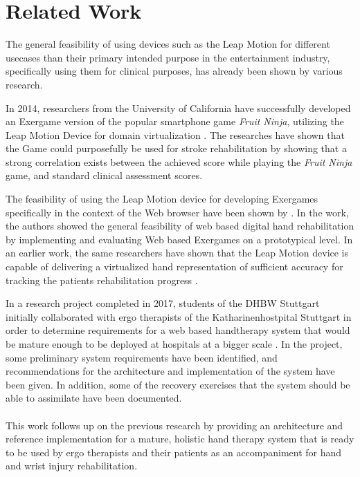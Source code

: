 \chapter{Related Work}
\label{sec:relatedwork}

The general feasibility of using devices such as the Leap Motion for different usecases than their primary intended purpose in the entertainment industry, specifically using them for clinical purposes, has already been shown by various research.

In 2014, researchers from the University of California have successfully developed an Exergame version of the popular smartphone game \emph{Fruit Ninja}, utilizing the Leap Motion Device for domain virtualization \cite{khademi2014free}. The researches have shown that the Game could purposefully be used for stroke rehabilitation by showing that a strong correlation exists between the achieved score while playing the \emph{Fruit Ninja} game, and standard clinical assessment scores.

The feasibility of using the Leap Motion device for developing Exergames specifically in the context of the Web browser have been shown by \cite{DigitizingHandRehabilitation}. In the work, the authors showed the general feasibility of web based digital hand rehabilitation by implementing and evaluating Web based Exergames on a prototypical level. In an earlier work, the same researchers have shown that the Leap Motion device is capable of delivering a virtualized hand representation of sufficient accuracy for tracking the patients rehabilitation progress \cite{AnalyzingHandTherapySuccess}.

In a research project completed in 2017, students of the DHBW Stuttgart initially collaborated with ergo therapists of the Katharinenhostpital Stuttgart in order to determine requirements for a web based handtherapy system that would be mature enough to be deployed at hospitals at a bigger scale \cite{StudiArbeitVolzBaumotte}. In the project, some preliminary system requirements have been identified, and recommendations for the architecture and implementation of the system have been given. In addition, some of the recovery exercises that the system should be able to assimilate have been documented.
\\\\
This work follows up on the previous research by providing an architecture and reference implementation for a mature, holistic hand therapy system that is ready to be used by ergo therapists and their patients as an accompaniment for hand and wrist injury rehabilitation.